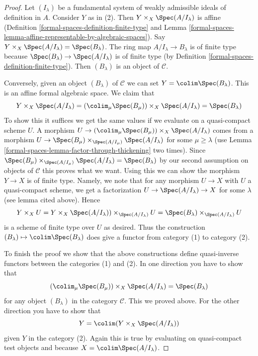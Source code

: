 \begin{proof}
Let $(I_\lambda)$ be a fundamental system of weakly admissible ideals
of definition in $A$. Consider $Y$ as in (2). Then
$Y \times_X \Spec(A/I_\lambda)$ is affine
(Definition \ref{formal-spaces-definition-finite-type}
and Lemma \ref{formal-spaces-lemma-affine-representable-by-algebraic-spaces}).
Say $Y \times_X \Spec(A/I_\lambda) = \Spec(B_\lambda)$.
The ring map $A/I_\lambda \to B_\lambda$ is of finite type
because $\Spec(B_\lambda) \to \Spec(A/I_\lambda)$ is of
finite type
(by Definition \ref{formal-spaces-definition-finite-type}).
Then $(B_\lambda)$ is an object of $\mathcal{C}$.

\medskip\noindent
Conversely, given an object $(B_\lambda)$ of $\mathcal{C}$ we can set
$Y = \colim \Spec(B_\lambda)$. This is an affine formal algebraic
space. We claim that
$$
Y \times_X \Spec(A/I_\lambda) =
\left(\colim_\mu \Spec(B_\mu)\right) \times_X \Spec(A/I_\lambda) =
\Spec(B_\lambda)
$$
To show this it suffices we get the same values if we evaluate
on a quasi-compact scheme $U$. A morphism
$U \to \left(\colim_\mu \Spec(B_\mu)\right) \times_X \Spec(A/I_\lambda)$
comes from a morphism
$U \to \Spec(B_\mu) \times_{\Spec(A/I_\mu)} \Spec(A/I_\lambda)$
for some $\mu \geq \lambda$ (use
Lemma \ref{formal-spaces-lemma-factor-through-thickening} two times). Since
$\Spec(B_\mu) \times_{\Spec(A/I_\mu)} \Spec(A/I_\lambda) = \Spec(B_\lambda)$
by our second assumption on objects of $\mathcal{C}$
this proves what we want. Using this we can show the morphism
$Y \to X$ is of finite type. Namely, we note that
for any morphism $U \to X$ with $U$ a quasi-compact scheme, we get
a factorization $U \to \Spec(A/I_\lambda) \to X$ for some $\lambda$
(see lemma cited above). Hence
$$
Y \times_X U =
Y \times_X \Spec(A/I_\lambda)) \times_{\Spec(A/I_\lambda)} U =
\Spec(B_\lambda) \times_{\Spec(A/I_\lambda)} U
$$
is a scheme of finite type over $U$ as desired. Thus the construction
$(B_\lambda) \mapsto \colim \Spec(B_\lambda)$ does give a functor
from category (1) to category (2).

\medskip\noindent
To finish the proof we show that the above constructions
define quasi-inverse functors between the categories (1) and (2).
In one direction you have to show that
$$
\left(\colim_\mu \Spec(B_\mu)\right) \times_X \Spec(A/I_\lambda) =
\Spec(B_\lambda)
$$
for any object $(B_\lambda)$ in the category $\mathcal{C}$.
This we proved above. For
the other direction you have to show that
$$
Y = \colim (Y \times_X \Spec(A/I_\lambda))
$$
given $Y$ in the category (2). Again this is true by evaluating on
quasi-compact test objects and because $X = \colim \Spec(A/I_\lambda)$.
\end{proof}

